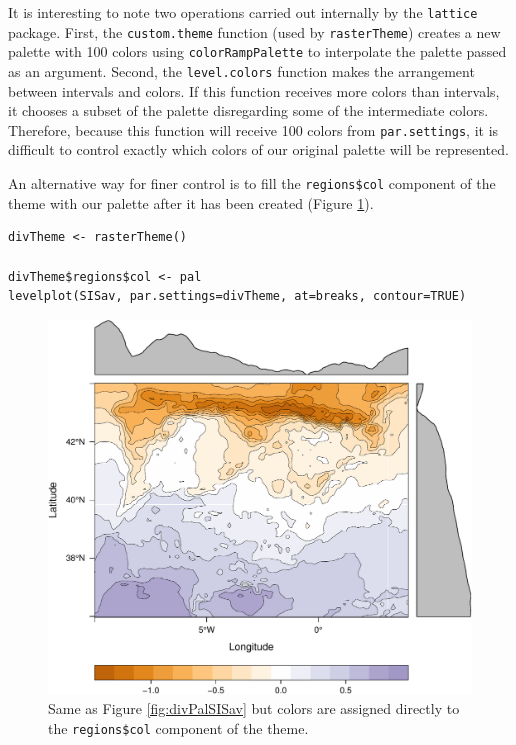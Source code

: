 \documentclass[smallroyalvopaper]{memoir}
\begin{document}
It is interesting to note two operations carried out internally by
the \texttt{lattice} package. First, the \texttt{custom.theme} function (used by
\texttt{rasterTheme}) creates a new palette with 100 colors using
\texttt{colorRampPalette} to interpolate the palette passed as an
argument. Second, the \texttt{level.colors} function makes the
arrangement between intervals and colors. If this function
receives more colors than intervals, it chooses a subset of the
palette disregarding some of the intermediate colors. Therefore,
because this function will receive 100 colors from \texttt{par.settings}, it
is difficult to control exactly which colors of our original
palette will be represented.

An alternative way for finer control is to fill the \texttt{regions\$col}
component of the theme with our palette after it has been created
(Figure \ref{fig:divPal_SISav_regions}).

\lstset{language=R,numbers=none}
\begin{lstlisting}
divTheme <- rasterTheme()

divTheme$regions$col <- pal
levelplot(SISav, par.settings=divTheme, at=breaks, contour=TRUE)
\end{lstlisting}

\begin{figure}[htb]
\centering
\includegraphics[width=.9\linewidth]{figs/divPalSISav_regions.pdf}
\caption{\label{fig:divPal_SISav_regions}Same as Figure \ref{fig:divPalSISav} but colors are assigned directly to the \texttt{regions\$col} component of the theme.}
\end{figure}
\end{document}
